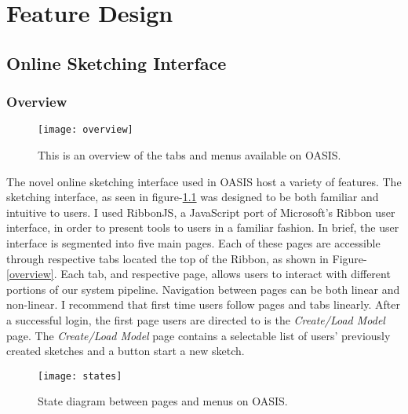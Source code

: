 \chapter{Feature Design} \label{sec:introduction}

\section{Online Sketching Interface}

	\subsection{Overview}

		\begin{figure}[h]
		\centering
		\texttt{[image: overview]}
		\caption{This is an overview of the tabs and menus available on OASIS.}
		\label{fig:overview}
		\end{figure}

		The novel online sketching interface used in OASIS host a variety of features.
		The sketching interface, as seen in figure-\ref{fig:overview} was designed to be both familiar and intuitive to users.
		I used RibbonJS, a JavaScript port of Microsoft's Ribbon user interface, in order to present tools to users in a familiar fashion\cite{}. 
		In brief, the user interface is segmented into five main pages. 
		Each of these pages are accessible through respective tabs located the top of the Ribbon, as shown in Figure-\ref{overview}.
		Each tab, and respective page, allows users to interact with different portions of our system pipeline.
		Navigation between pages can be both linear and non-linear. 
		I recommend that first time users follow pages and tabs linearly. 
		After a successful login, the first page users are directed to is the \textit{Create/Load Model} page.
		The \textit{Create/Load Model} page contains a selectable list of users' previously created sketches and a button start a new sketch.\\

		\begin{figure}[h]
		\centering
		\texttt{[image: states]}
		\caption{State diagram between pages and menus on OASIS.}
		\label{fig:states}
		\end{figure}

